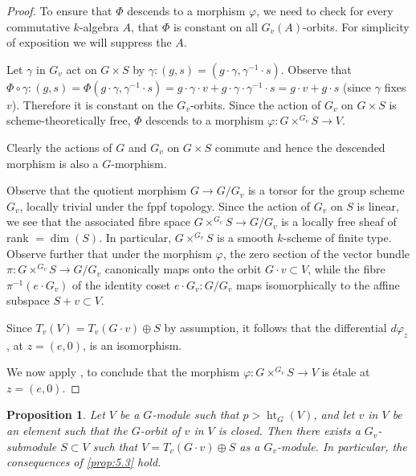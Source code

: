 \documentclass[11pt,a4paper]{article}
\theoremstyle{plain}
\newtheorem{proposition}[theorem]{Proposition}
\theoremstyle{definition}
\DeclareMathOperator{\htG}{ht}
\begin{document}
\begin{proof}
To ensure that $\Phi$ descends to a morphism $\varphi$, we need to check for every commutative $k$-algebra $A$, that $\Phi$ is constant on all $G_v(A)$-orbits. For simplicity of exposition we will suppress the $A$.

Let $\gamma$ in $G_v$ act on $G \times S$ by $\gamma : (g, s) = (g \cdot \gamma, \gamma^{-1} \cdot s)$. Observe that $\Phi \circ \gamma : (g, s) = \Phi(g \cdot \gamma, \gamma^{-1} \cdot s) = g \cdot \gamma \cdot v + g \cdot \gamma \cdot \gamma^{-1} \cdot s = g \cdot v + g \cdot s$ (since $\gamma$ fixes $v$). Therefore it is constant on the $G_v$-orbits. Since the action of $G_v$ on $G \times S$ is scheme-theoretically free, $\Phi$ descends to a morphism $\varphi : G \times^{G_v} S \to V$.

Clearly the actions of $G$ and $G_v$ on $G \times S$ commute and hence the descended morphism is also a $G$-morphism.

Observe that the quotient morphism $G \to G/G_v$ is a torsor for the group scheme $G_v$, locally trivial under the fppf topology. Since the action of $G_v$ on $S$ is linear, we see that the associated fibre space $G \times^{G_v} S \to G/G_v$ is a locally free sheaf of rank $= \dim(S)$. In particular, $G \times^{G_v} S$ is a smooth $k$-scheme of finite type. Observe further that under the morphism $\varphi$, the zero section of the vector bundle $\pi : G \times^{G_v} S \to G/G_v$ canonically maps onto the orbit $G \cdot v \subset V$, while the fibre $\pi^{-1}(e \cdot G_v)$ of the identity coset $e \cdot G_v : G/G_v$ maps isomorphically to the affine subspace $S + v \subset V$.

Since $T_v(V) = T_v(G \cdot v) \oplus S$ by assumption, it follows that the differential $d\varphi_z$, at $z = (e, 0)$, is an isomorphism.

We now apply \cite[Lemme~2.9]{D}, to conclude that the morphism $\varphi : G \times^{G_v} S \to V$ is \'etale at $z = (e, 0)$. \qedhere
\end{proof}

\begin{proposition} \label{prop:5.4}
Let $V$ be a $G$-module such that $p > \htG_G(V)$, and let $v$ in $V$ be an element such that the $G$-orbit of $v$ in $V$ is closed. Then there exists a $G_v$-submodule $S \subset V$ such that $V = T_v(G \cdot v) \oplus S$ as a $G_v$-module. In particular, the consequences of \ref{prop:5.3} hold.
\end{proposition}
\end{document}
